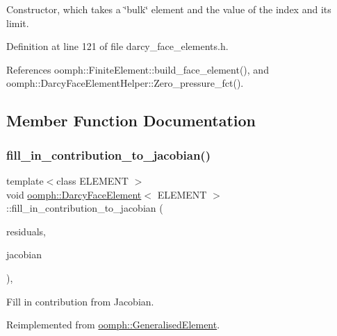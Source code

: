 Constructor, which takes a \char`\"{}bulk\char`\"{} element and the value of the index and its limit. 



Definition at line 121 of file darcy\+\_\+face\+\_\+elements.\+h.



References oomph\+::\+Finite\+Element\+::build\+\_\+face\+\_\+element(), and oomph\+::\+Darcy\+Face\+Element\+Helper\+::\+Zero\+\_\+pressure\+\_\+fct().



\subsection{Member Function Documentation}
\mbox{\label{classoomph_1_1DarcyFaceElement_a7b114cbc2c42545d84be0342801ae7c0}} 
\subsubsection{\texorpdfstring{fill\+\_\+in\+\_\+contribution\+\_\+to\+\_\+jacobian()}{fill\_in\_contribution\_to\_jacobian()}}
{\footnotesize\ttfamily template$<$class E\+L\+E\+M\+E\+NT $>$ \\
void \hyperlink{classoomph_1_1DarcyFaceElement}{oomph\+::\+Darcy\+Face\+Element}$<$ E\+L\+E\+M\+E\+NT $>$\+::fill\+\_\+in\+\_\+contribution\+\_\+to\+\_\+jacobian (\begin{DoxyParamCaption}\item[{\hyperlink{classoomph_1_1Vector}{Vector}$<$ double $>$ \&}]{residuals,  }\item[{\hyperlink{classoomph_1_1DenseMatrix}{Dense\+Matrix}$<$ double $>$ \&}]{jacobian }\end{DoxyParamCaption})\hspace{0.3cm}{\ttfamily [inline]}, {\ttfamily [virtual]}}



Fill in contribution from Jacobian. 



Reimplemented from \hyperlink{classoomph_1_1GeneralisedElement_a6ae09fc0d68e4309ac1b03583d252845}{oomph\+::\+Generalised\+Element}.



